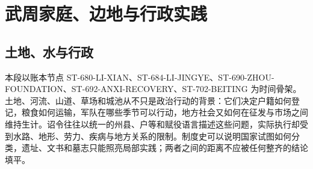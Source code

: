 \section{武周家庭、边地与行政实践} \label{sec:wu-zhou-family-frontier-administration}  \subsection{土地、水与行政} 本段以账本节点 ST-680-LI-XIAN、ST-684-LI-JINGYE、ST-690-ZHOU-FOUNDATION、ST-692-ANXI-RECOVERY、ST-702-BEITING 为时间骨架。土地、河流、山道、草场和城池从不只是政治行动的背景：它们决定户籍如何登记，粮食如何运输，军队在哪些季节可以行动，地方社会又如何在征发与市场之间维持生计。诏令往往以统一的州县、户等和赋役语言描述这些问题，实际执行却受到水路、地形、劳力、疾病与地方关系的限制。制度史可以说明国家试图如何分类，遗址、文书和墓志只能照亮局部实践；两者之间的距离不应被任何整齐的结论填平。  
